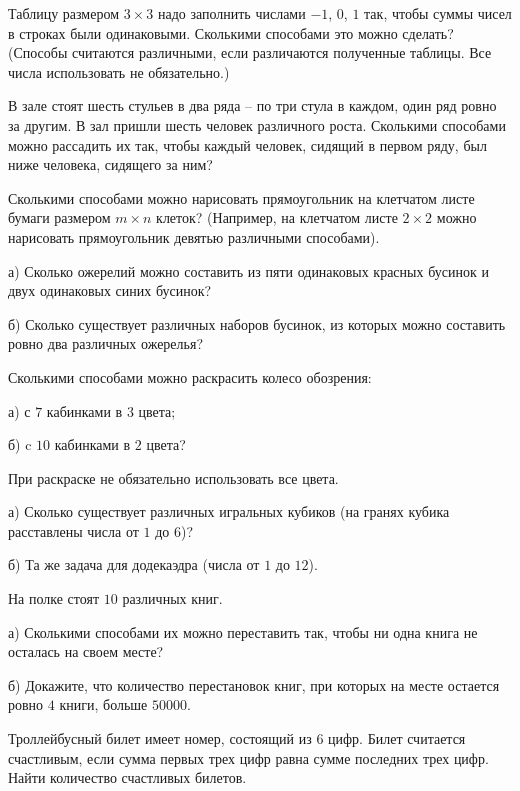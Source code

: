 \resetproblem \begingroup %
    \def\jeolmdate{19 октября 2018}%
\jeolmheader \endgroup


\begin{problems}

\item Таблицу размером $3\times3$ надо заполнить числами $-1$, $0$, $1$ так, чтобы суммы чисел в строках были одинаковыми. Сколькими способами это можно сделать? (Способы считаются различными, если различаются полученные таблицы. Все числа использовать не обязательно.) %

\item В зале стоят шесть стульев в два ряда – по три стула в каждом, один ряд ровно за другим. В зал пришли шесть человек различного роста. Сколькими способами можно рассадить их так, чтобы каждый человек, сидящий в первом ряду, был ниже человека, сидящего за ним? %

\item Сколькими способами можно нарисовать прямоугольник на клетчатом листе бумаги размером $m \times n$ клеток? (Например, на клетчатом листе $2\times 2$  можно нарисовать прямоугольник девятью различными способами). 

\item а) Сколько ожерелий можно составить из пяти одинаковых красных бусинок и двух одинаковых синих бусинок?

б) Сколько существует различных наборов бусинок, из которых можно составить ровно два различных ожерелья?%

\item Сколькими способами можно раскрасить колесо обозрения:

а) с $7$ кабинками в $3$ цвета; %

б) c $10$ кабинками в $2$ цвета? %

При раскраске не обязательно использовать все цвета.

\item а) Сколько существует различных игральных кубиков (на гранях кубика расставлены числа от $1$ до $6$)? %

б) Та же задача для додекаэдра (числа от $1$ до $12$). %

\item На полке стоят $10$ различных книг. 

а) Сколькими способами их можно переставить так, чтобы ни одна книга не осталась на своем месте?

б) Докажите, что количество перестановок книг, при которых на месте остается ровно $4$ книги, больше $50 000$.

\item Троллейбусный билет имеет номер, состоящий из $6$ цифр. Билет считается счастливым, если сумма первых трех цифр равна сумме последних трех цифр. Найти количество счастливых билетов. %



\end{problems}
